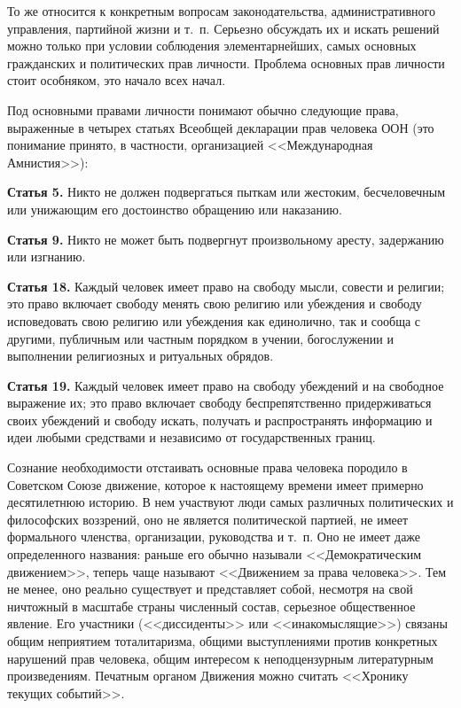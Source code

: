 \documentclass{book}
\begin{document}
То же относится к конкретным вопросам законодательства, административного управления, партийной жизни и т.~п. Серьез­но обсуждать их и искать решений можно только при условии соблюдения элементарнейших, самых основных гражданских и политических прав личности. Проблема основных прав лич­ности стоит особняком, это начало всех начал.

Под основными правами личности понимают обычно следу­ющие права, выраженные в четырех статьях Всеобщей декла­рации прав человека ООН (это понимание принято, в частности, организацией <<Международная Амнистия>>):

\textbf{Статья 5.}  Никто не должен подвергаться пыткам или жестоким, бесчеловечным или унижающим его достоинство обращению или наказанию.

\textbf{Статья 9.}  Никто не может быть подвергнут произвольному аресту, задержанию или изгнанию.

\textbf{Статья 18.}  Каждый человек имеет право на свободу мысли, совести и религии; это право включает свободу менять свою религию или убеждения и свободу исповедовать свою религию или убеждения как единолично, так и сообща с другими, публичным или частным порядком в учении, богослужении и выполнении религиозных и ритуальных обрядов.

\textbf{Статья 19.} Каждый человек имеет право на свободу убежде­ний и на свободное выражение их; это право включает свободу беспрепятственно придерживаться своих убеждений и свободу искать, получать и распространять информацию и идеи любыми средствами и независимо от государственных границ.

Сознание необходимости отстаивать основные права челове­ка породило в Советском Союзе движение, которое к насто­ящему времени имеет примерно десятилетнюю историю. В нем участвуют люди самых различных политических и философ­ских воззрений, оно не является политической партией, не имеет формального членства, организации, руководства и т.~п. Оно не имеет даже определенного названия: раньше его обычно назы­вали <<Демократическим движением>>, теперь чаще называют <<Движением за права человека>>. Тем не менее, оно реально су­ществует и представляет собой, несмотря на свой ничтожный в масштабе страны численный состав, серьезное общественное явление. Его участники (<<диссиденты>> или <<инакомыслящие>>) связаны общим неприятием тоталитаризма, общими выступле­ниями против конкретных нарушений прав человека, общим интересом к неподцензурным литературным произведениям. Печатным органом Движения можно считать <<Хронику текущих событий>>.
\end{document}
